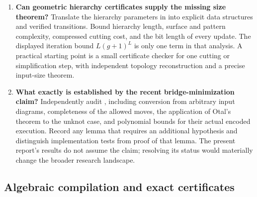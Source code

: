 \begin{enumerate}[label=\textbf{Q\arabic*.},leftmargin=3em]
\item \textbf{Can geometric hierarchy certificates supply the missing size theorem?}
Translate the hierarchy parameters in \cite{Lackenby2026Hierarchies} into
explicit data structures and verified transitions. Bound hierarchy length,
surface and pattern complexity, compressed cutting cost, and the bit
length of every update. The displayed iteration bound $L(g+1)^L$ is
only one term in that analysis. A practical starting point is a small
certificate checker for one cutting or simplification step, with
independent topology reconstruction and a precise input-size theorem.

\item \textbf{What exactly is established by the recent bridge-minimization claim?}
Independently audit \cite{Musick2026}, including conversion from arbitrary
input diagrams, completeness of the allowed moves, the application of
Otal's theorem to the unknot case, and polynomial
bounds for their actual encoded
execution. Record any lemma that requires an additional hypothesis and
distinguish implementation tests from proof of that lemma. The present
report's results do not assume the claim; resolving its status would
materially change the broader research landscape.
\end{enumerate}

\subsection{Algebraic compilation and exact certificates}

